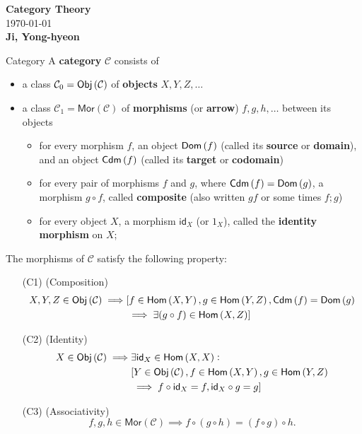 \documentclass[11pt,openany]{article}
\theoremstyle{definition}
\begin{document}
\begin{center}
	\huge\textbf{Category Theory}\\
	\vspace{0.5em}
	\normalsize{\today}\\
	\vspace{0.5em}
	\large\textbf{Ji, Yong-hyeon}\\
	\vspace{0.5em}
\end{center}

\begin{defbox}{Category}
	A \textbf{category} $\mathcal{C}$ consists of 
	\begin{itemize}
		\item a class $\mathcal{C}_0=\mathsf{Obj}\left(\mathcal{C}\right)$ of \textbf{objects} $X,Y,Z,\dots$
		\item a class $\mathcal{C}_1=\mathsf{Mor}(\mathcal{C})$ of \textbf{morphisms} (or \textbf{arrow}) $f,g,h,\dots$ between its objects
		\begin{itemize}
			\item for every morphism $f$, an object $\mathsf{Dom}\left(f\right)$ (called its \textbf{source} or \textbf{domain}), and an object $\mathsf{Cdm}\left(f\right)$ (called its \textbf{target} or \textbf{codomain})
			\item for every pair of morphisms $f$ and $g$, where $\mathsf{Cdm}\left(f\right)=\mathsf{Dom}\left(g\right)$, a morphism $g\circ f$, called \textbf{composite} (also written $gf$ or some times $f;g$)
			\item for every object $X$, a morphism $\mathsf{id}_X$ (or $1_X$), called the \textbf{identity morphism} on $X$;
		\end{itemize}
	\end{itemize}
	The morphisms of $\mathcal{C}$ satisfy the following property:
	\begin{itemize}
		\item[(C1)] (Composition) 
		\begin{align*}
			X,Y,Z\in\mathsf{Obj}\left(\mathcal{C}\right)\implies &[f\in\mathsf{Hom}\left(X,Y\right),g\in\mathsf{Hom}\left(Y,Z\right),\mathsf{Cdm}\left(f\right)=\mathsf{Dom}\left(g\right)\\
			&\implies \exists(g\circ f)\in\mathsf{Hom}\left(X,Z\right)]
		\end{align*}
		\item[(C2)] (Identity)
		\begin{align*}
			X\in\mathsf{Obj}\left(\mathcal{C}\right)\implies&\exists\mathsf{id}_X\in\mathsf{Hom}\left(X,X\right):\\
			&[Y\in\mathsf{Obj}\left(\mathcal{C}\right),f\in\mathsf{Hom}\left(X,Y\right),g\in\mathsf{Hom}\left(Y,Z\right)\\
			&\implies f\circ\mathsf{id}_X=f, \mathsf{id}_X\circ g=g]
		\end{align*}
		\item[(C3)] (Associativity) \[
		f,g,h\in\mathsf{Mor}(\mathcal{C})\implies f\circ(g\circ h)=(f\circ g)\circ h.
		\]
	\end{itemize}
\end{defbox}
\end{document}
